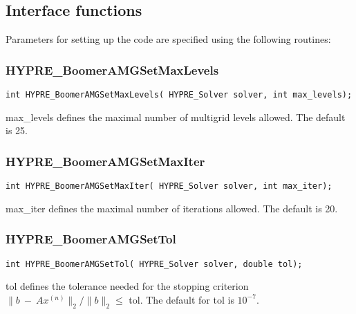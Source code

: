 \subsection{Interface functions}

Parameters for setting up the code are specified using the following routines:

\subsubsection*{HYPRE\_BoomerAMGSetMaxLevels}
\begin{display}
\begin{verbatim}
int HYPRE_BoomerAMGSetMaxLevels( HYPRE_Solver solver, int max_levels);
\end{verbatim}
\end{display}
max\_levels defines the maximal number of multigrid levels allowed.
The default is 25.

\subsubsection*{HYPRE\_BoomerAMGSetMaxIter}
\begin{display}
\begin{verbatim}
int HYPRE_BoomerAMGSetMaxIter( HYPRE_Solver solver, int max_iter);
\end{verbatim}
\end{display}
max\_iter defines the maximal number of iterations allowed.
The default is 20.

\subsubsection*{HYPRE\_BoomerAMGSetTol}
\begin{display}
\begin{verbatim}
int HYPRE_BoomerAMGSetTol( HYPRE_Solver solver, double tol);
\end{verbatim}
\end{display}
tol defines the tolerance needed for the stopping criterion
$\| b ~ - ~ Ax^{(n)} \|_2 / \| b \|_2 \leq $ tol.
The default for tol is $10 ^{-7}$.


